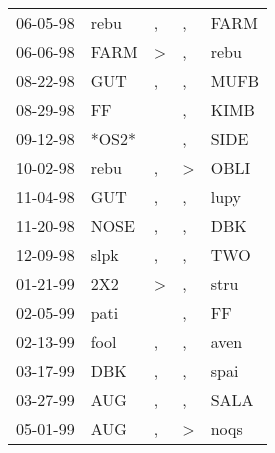 \begin{supertabular}{p{0.07\textwidth}p{0.06\textwidth}p{0.02\textwidth}p{0.02\textwidth}p{0.06\textwidth}}
 06-05-98\textsuperscript{} &           rebu\textsuperscript{} &             , &             , &  FARM\textsuperscript{} \\
 06-06-98\textsuperscript{} &           FARM\textsuperscript{} &  \textgreater &             , &  rebu\textsuperscript{} \\
 08-22-98\textsuperscript{} &            GUT\textsuperscript{} &             , &             , &  MUFB\textsuperscript{} \\
 08-29-98\textsuperscript{} &             FF\textsuperscript{} &               &             , &  KIMB\textsuperscript{} \\
 09-12-98\textsuperscript{} &                            *OS2* &               &             , &  SIDE\textsuperscript{} \\
 10-02-98\textsuperscript{} &           rebu\textsuperscript{} &             , &  \textgreater &  OBLI\textsuperscript{} \\
 11-04-98\textsuperscript{} &            GUT\textsuperscript{} &             , &             , &  lupy\textsuperscript{} \\
 11-20-98\textsuperscript{} &           NOSE\textsuperscript{} &             , &             , &   DBK\textsuperscript{} \\
 12-09-98\textsuperscript{} &           slpk\textsuperscript{} &             , &             , &   TWO\textsuperscript{} \\
 01-21-99\textsuperscript{} &            2X2\textsuperscript{} &  \textgreater &             , &  stru\textsuperscript{} \\
 02-05-99\textsuperscript{} &           pati\textsuperscript{} &               &             , &    FF\textsuperscript{} \\
 02-13-99\textsuperscript{} &           fool\textsuperscript{} &             , &             , &  aven\textsuperscript{} \\
 03-17-99\textsuperscript{} &            DBK\textsuperscript{} &             , &             , &  spai\textsuperscript{} \\
 03-27-99\textsuperscript{} &            AUG\textsuperscript{} &             , &             , &  SALA\textsuperscript{} \\
 05-01-99\textsuperscript{} &            AUG\textsuperscript{} &             , &  \textgreater &  noqs\textsuperscript{} \\

\end{supertabular}
